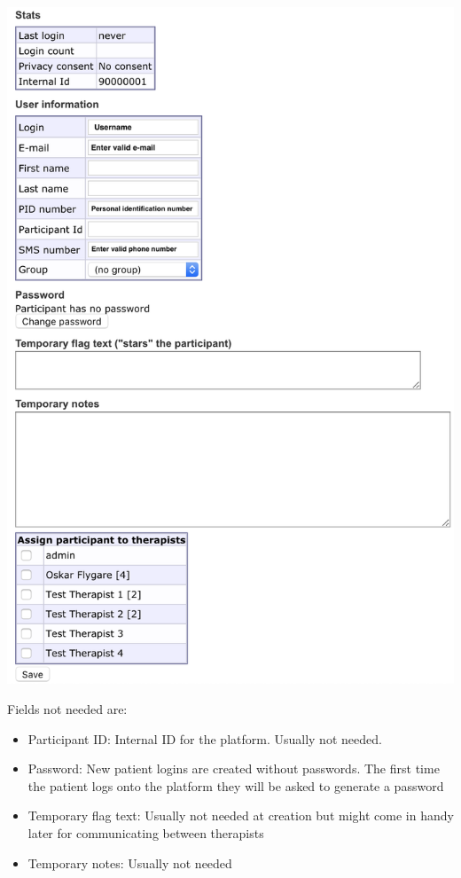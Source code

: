 \documentclass[]{book}
\providecommand{\tightlist}{%
  \setlength{\itemsep}{0pt}\setlength{\parskip}{0pt}}
\theoremstyle{definition}
\theoremstyle{definition}
\theoremstyle{definition}
\theoremstyle{remark}
\begin{document}
\includegraphics{images/new-participant.png}

Fields not needed are:

\begin{itemize}
\tightlist
\item
  Participant ID: Internal ID for the platform. Usually not needed.
\item
  Password: New patient logins are created without passwords. The first
  time the patient logs onto the platform they will be asked to generate
  a password
\item
  Temporary flag text: Usually not needed at creation but might come in
  handy later for communicating between therapists
\item
  Temporary notes: Usually not needed
\end{itemize}
\end{document}
